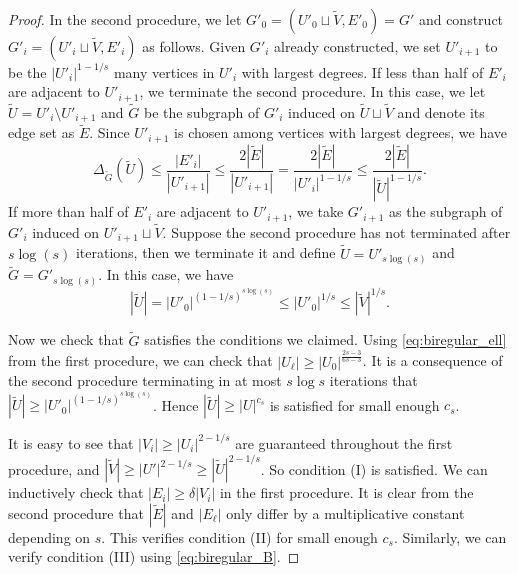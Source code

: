 \documentclass[11pt]{article}
\theoremstyle{definition}
\begin{document}
\begin{proof}
    In the second procedure, we let $G'_0 = (U'_0 \sqcup \tilde{V}, E'_0) =G'$ and construct $G'_i = (U'_i \sqcup \tilde{V}, E'_i)$ as follows. Given $G'_i$ already constructed, we set $U'_{i+1}$ to be the $|U'_i|^{1-1/s}$ many vertices in $U'_i$ with largest degrees. If less than half of $E'_i$ are adjacent to $U'_{i+1}$, we terminate the second procedure. In this case, we let $\tilde{U} = U'_i \setminus U'_{i+1}$ and $\tilde{G}$ be the subgraph of $G'_i$ induced on $\tilde{U} \sqcup \tilde{V}$ and denote its edge set as $\tilde{E}$. Since $U'_{i+1}$ is chosen among vertices with largest degrees, we have \begin{equation}\label{eq:biregular_A1}
        \Delta_{\tilde{G}}(\tilde{U}) \leq \frac{|E'_i|}{|U'_{i+1}|} \leq \frac{2|\tilde{E}|}{|U'_{i+1}|} = \frac{2|\tilde{E}|}{|U'_i|^{1-1/s}} \leq \frac{2|\tilde{E}|}{|\tilde{U}|^{1-1/s}}.
    \end{equation} If more than half of $E'_i$ are adjacent to $U'_{i+1}$, we take $G'_{i+1}$ as the subgraph of $G'_i$ induced on $U'_{i+1}\sqcup \tilde{V}$. Suppose the second procedure has not terminated after $s\log(s)$ iterations, then we terminate it and define $\tilde{U} = U'_{s\log(s)}$ and $\tilde{G} = G'_{s\log(s)}$. In this case, we have \begin{equation}\label{eq:biregular_A2}
        |\tilde{U}| = |U'_0|^{(1-1/s)^{s\log(s)}} \leq |U'_0|^{1/s} \leq |\tilde{V}|^{1/s}.
    \end{equation}

    Now we check that $\tilde{G}$ satisfies the conditions we claimed. Using \eqref{eq:biregular_ell} from the first procedure, we can check that $|U_\ell| \geq |U_0|^{\frac{2s-3}{6s-3}}$. It is a consequence of the second procedure terminating in at most $s \log s $ iterations that $|\tilde{U}| \geq |U'_0|^{(1-1/s)^{s\log(s)}}$. Hence $|\tilde{U}| \geq |U|^{c_s}$ is satisfied for small enough $c_s$.

    It is easy to see that $|V_i| \geq |U_i|^{2-1/s}$ are guaranteed throughout the first procedure, and $|\tilde{V}| \geq |U'|^{2-1/s} \geq |\tilde{U}|^{2-1/s}$. So condition (I) is satisfied. We can inductively check that $|E_i| \geq \delta|V_i|$ in the first procedure. It is clear from the second procedure that $|\tilde{E}|$ and $|E_\ell|$ only differ by a multiplicative constant depending on $s$. This verifies condition (II) for small enough $c_s$. Similarly, we can verify condition (III) using \eqref{eq:biregular_B}.


\end{proof}
\end{document}

